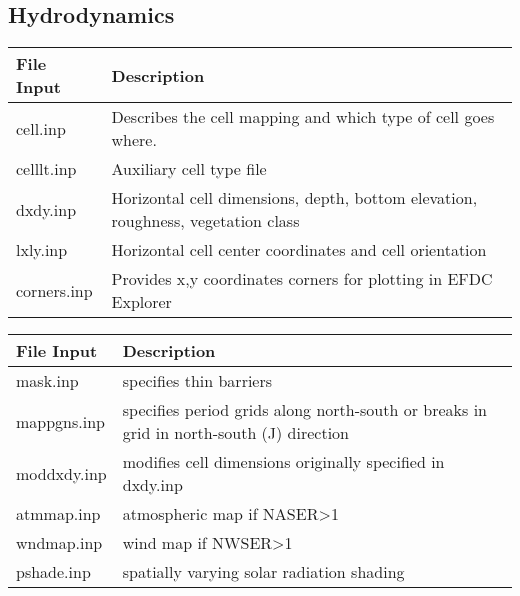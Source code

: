 \documentclass[letterpaper,10pt,english]{sphinxmanual}
\begin{document}
\subsection{Hydrodynamics}
\label{\detokenize{inputfiles/hydrodynamics_files/index:hydrodynamics}}\label{\detokenize{inputfiles/hydrodynamics_files/index:id1}}\label{\detokenize{inputfiles/hydrodynamics_files/index::doc}}

\begin{savenotes}\sphinxattablestart
\centering
\begin{tabulary}{\linewidth}[t]{|T|T|}
\hline
\sphinxstyletheadfamily 
File Input
&\sphinxstyletheadfamily 
Description
\\
\hline
cell.inp
&
Describes the cell mapping and which type of cell goes where.
\\
\hline
celllt.inp
&
Auxiliary cell type file
\\
\hline
dxdy.inp
&
Horizontal cell dimensions, depth, bottom elevation, roughness, vegetation class
\\
\hline
lxly.inp
&
Horizontal cell center coordinates and cell orientation
\\
\hline
corners.inp
&
Provides x,y coordinates corners for plotting in EFDC Explorer
\\
\hline
\end{tabulary}
\par
\sphinxattableend\end{savenotes}


\begin{savenotes}\sphinxattablestart
\centering
\begin{tabulary}{\linewidth}[t]{|T|T|}
\hline
\sphinxstyletheadfamily 
File Input
&\sphinxstyletheadfamily 
Description
\\
\hline
mask.inp
&
specifies thin barriers
\\
\hline
mappgns.inp
&
specifies period grids along north-south or breaks in grid in north-south (J) direction
\\
\hline
moddxdy.inp
&
modifies cell dimensions originally specified in dxdy.inp
\\
\hline
atmmap.inp
&
atmospheric map if NASER\textgreater{}1
\\
\hline
wndmap.inp
&
wind map if NWSER\textgreater{}1
\\
\hline
pshade.inp
&
spatially varying solar radiation shading
\\
\hline
\end{tabulary}
\par
\sphinxattableend\end{savenotes}
\end{document}

